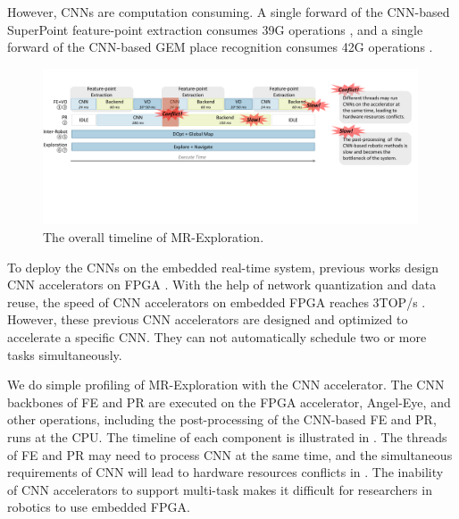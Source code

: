 However, CNNs are computation consuming. A single forward of the CNN-based SuperPoint \cite{detone2018superpoint} feature-point extraction consumes 39G operations \cite{detone2018superpoint}, and a single forward of the CNN-based GEM \cite{radenovic2018fine} place recognition consumes 42G operations \cite{radenovic2018fine}.


\begin{figure}[t]
    \centering
	\includegraphics[width=0.99\textwidth]{fig/overalltime.pdf} 	
    \caption{
    The overall timeline of MR-Exploration.
    }
	\label{fig:overalltime}
\end{figure}


To deploy the CNNs on the embedded real-time system, previous works design CNN accelerators on FPGA \cite{guo2017angel,yu2018instruction,li_high_2016,qiu2016going,lu_evaluating_2017}. With the help of network quantization and data reuse, the speed of CNN accelerators on embedded FPGA reaches 3TOP/s \cite{lu_evaluating_2017}.
However, these previous CNN accelerators are designed and optimized to accelerate a specific CNN. They can not automatically schedule two or more tasks simultaneously. 


We do simple profiling of MR-Exploration with the CNN accelerator. The CNN backbones of FE and  PR are executed on the FPGA accelerator, Angel-Eye\cite{guo2017angel}, and other operations, including the post-processing of the CNN-based FE and PR, runs at the CPU. The timeline of each component is illustrated in . 
The threads of FE and PR may need to process CNN at the same time,  and the simultaneous requirements of CNN will lead to hardware resources conflicts in . The inability of CNN accelerators to support multi-task makes it difficult for researchers in robotics to use embedded FPGA.

